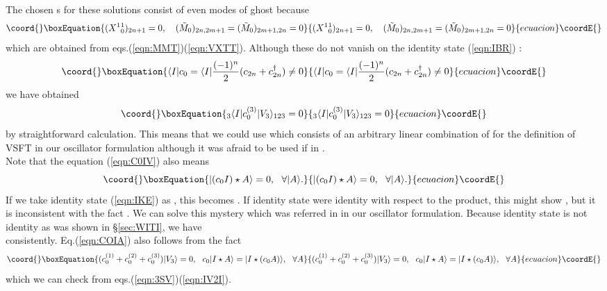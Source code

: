 \documentclass[12pt,a4paper]{article}
\def\M0{{\tilde M}_0}
\begin{document}
The chosen \coordHE{}s for these solutions consist of even modes of \coordHE{} ghost because
\begin{equation}\coord{}\boxEquation{
(X^1{}^1_0)_{2n+1}=0,\ \ \ (\M0)_{2n,2m+1}=(\M0)_{2m+1,2n}=0
}{
(X^1{}^1_0)_{2n+1}=0,\ \ \ (\M0)_{2n,2m+1}=(\M0)_{2m+1,2n}=0
}{ecuacion}\coordE{}\end{equation}
which are obtained from eqs.(\ref{eqn:MMT})(\ref{eqn:VXTT}).
Although these \coordHE{} do not vanish on the identity state \coordHE{} (\ref{eqn:IBR}) :
\begin{equation}\coord{}\boxEquation{
\langle I|c_0=\langle I|{(-1)^n\over2}(c_{2n}+c_{2n}^\dagger)\not=0
}{
\langle I|c_0=\langle I|{(-1)^n\over2}(c_{2n}+c_{2n}^\dagger)\not=0
}{ecuacion}\coordE{}\end{equation}
we have obtained
\begin{equation}\coord{}\boxEquation{
\label{eqn:C0IV}
{}_3\langle I|c_0^{(3)}|V_3\rangle_{123}=0
}{
{}_3\langle I|c_0^{(3)}|V_3\rangle_{123}=0
}{ecuacion}\coordE{}\end{equation}
by straightforward calculation. 
This means that we could use \coordHE{} which consists of an arbitrary linear combination of \coordHE{} for the definition of VSFT in our oscillator formulation although it was afraid to be used if \coordHE{} in \cite{VSFT}.\\

Note that the equation (\ref{eqn:C0IV}) also means
\begin{equation}\coord{}\boxEquation{
\label{eqn:COIA}
|(c_0I)\star A\rangle=0,\ \ \forall |A\rangle.
}{
|(c_0I)\star A\rangle=0,\ \ \forall |A\rangle.
}{ecuacion}\coordE{}\end{equation}
If we take identity state \coordHE{} (\ref{eqn:IKE}) as \coordHE{}, this becomes \coordHE{}. If identity state \coordHE{} were identity with respect to the \myHighlight{$\star$}\coordHE{} product, this might show \coordHE{}, but it is inconsistent with the fact \coordHE{}. We can solve this mystery which was referred in \cite{RZ} in our oscillator formulation.
Because identity state \coordHE{} is not identity  as was shown in \S \ref{sec:WITI}, we have \\ \coordHE{} consistently. Eq.(\ref{eqn:COIA}) also follows from the fact
\begin{equation}\coord{}\boxEquation{
 (c_0^{(1)}+c_0^{(2)}+c_0^{(3)})|V_3\rangle=0,\ \ c_0|I\star A\rangle=|I\star(c_0A)\rangle,\ \ \forall A
}{
 (c_0^{(1)}+c_0^{(2)}+c_0^{(3)})|V_3\rangle=0,\ \ c_0|I\star A\rangle=|I\star(c_0A)\rangle,\ \ \forall A
}{ecuacion}\coordE{}\end{equation}
which we can check from eqs.(\ref{eqn:3SV})(\ref{eqn:IV2I}).
\end{document}
